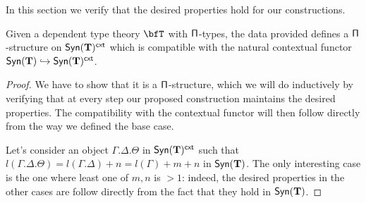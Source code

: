 In this section we verify that the desired properties hold for our
constructions.

\begin{lem}\label{extpistruct}
  Given a dependent type theory $\bfT$ with $\operatorname{\mathsf{\Pi}}$-types, the data provided
  defines a $\operatorname{\mathsf{\Pi}}$-structure on $\mathsf{Syn}(\mathbf{T})^{\operatorname{\mathsf{cxt}}}$ which is
  compatible with the natural contextual functor
  $\mathsf{Syn}(\mathbf{T})\hookrightarrow\mathsf{Syn}(\mathbf{T})^{\operatorname{\mathsf{cxt}}}$.
\end{lem}
\begin{proof}
  We have to
  show that it is a $\operatorname{\mathsf{\Pi}}$-structure, which we will do inductively by verifying
  that at every step our proposed construction maintains the desired properties.
  The compatibility with the contextual functor will then follow directly from
  the way we defined the base case.

  Let's consider an object $\Gamma.\Delta.\Theta$ in $\mathsf{Syn}(\mathbf{T})^{\operatorname{\mathsf{cxt}}}$ such that
  $l(\Gamma.\Delta.\Theta)=l(\Gamma.\Delta)+n=l(\Gamma)+m+n$ in $\mathsf{Syn}(\mathbf{T})$. The
  only interesting case is the one where least one of $m,n$ is
  $>1$: indeed, the desired properties in the other cases are
  follow directly from the fact that they hold in $\mathsf{Syn}(\mathbf{T})$.


\end{proof}
